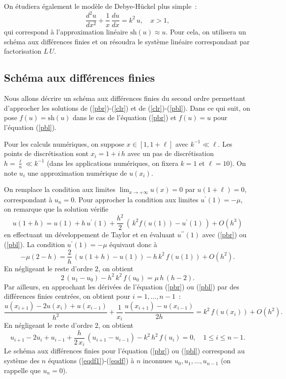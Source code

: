 \documentclass[a4paper,10pt]{article}
\begin{document}
On \'etudiera \'egalement le mod\`ele de Debye-H\"uckel plus simple~:
\begin{equation}
\label{pbl}
\frac{d^2 u}{dx^2} + \frac{1}{x}\, \frac{du}{dx} = k^2\, u, 
\quad x > 1,
\end{equation} 
qui correspond \`a l'approximation lin\'eaire $\mathrm{sh}\left( u \right) \approx u$. Pour cela, on utilisera
un sch\'ema aux diff\'erences finies et on r\'esoudra le syst\`eme lin\'eaire correspondant par
factorisation $L\, U$.

\subsection{\label{df}Sch\'ema aux diff\'erences finies}

Nous allons d\'ecrire un sch\'ema aux diff\'erences finies du second ordre permettant d'approcher les solutions
de (\ref{pbr})-(\ref{clr}) et de (\ref{clr})-(\ref{pbl}). Dans ce qui suit, on pose $f(u)=\mathrm{sh}\left( u \right)$
dans le cas de l'\'equation (\ref{pbr}) et $f(u)=u$ pour l'\'equation (\ref{pbl}).

Pour les calculs num\'eriques, on suppose $x \in [1,1+ \ell ]$ avec $k^{-1} \ll \ell $. 
Les points de discr\'etisation sont $x_i = 1+i\, h$ avec un pas de discr\'etisation
$h=\frac{\ell}{n} \ll k^{-1}$
(dans les applications num\'eriques, on fixera $k=1$ et $\ell = 10$).
On note $u_i$ une approximation num\'erique de $u(x_i )$.

On remplace la condition aux limites $\lim_{x\rightarrow +\infty}{u(x)}=0$ par 
$u(1+\ell )=0$, correspondant \`a $u_{n}=0$. 
Pour approcher la condition aux limites $u^\prime (1)=-\mu$, on remarque que la solution v\'erifie
$$
u(1+h)=u(1)+h\, u^\prime (1) + \frac{h^2}{2}\, \left( \, k^2 f(u(1)) - u^\prime (1)   \, \right) + O(h^3)
$$
en effectuant un d\'eveloppement de Taylor et en \'evaluant $u^{\prime\prime}(1)$ avec (\ref{pbr}) ou (\ref{pbl}).
La condition $u^\prime (1)=-\mu$ \'equivaut donc \`a
$$
-\mu (2-h) = \frac{2}{h}\, (u(1+h)-u(1)) - h \, k^2\, f(u(1)) +O(h^2).
$$
En n\'egligeant le reste d'ordre $2$, on obtient
\begin{equation}
\label{eqdf1}
2\, (u_1 -u_0) - h^2 \, k^2\, f(u_0)
= \mu \, h\, (h-2) 
.
\end{equation}
Par ailleurs, en approchant les d\'eriv\'ees de l'\'equation (\ref{pbr}) ou (\ref{pbl}) par des diff\'erences
finies centr\'ees, on obtient pour $i=1 , \ldots , n-1$~:
$$
\frac{u(x_{i+1})-2u(x_i)+u(x_{i-1})}{h^2}+ \frac{1}{x_i}\, \frac{u(x_{i+1})-u(x_{i-1})}{2h}= k^2\, f(u(x_i)) +O(h^2).
$$ 
En n\'egligeant le reste d'ordre $2$, on obtient
\begin{equation}
\label{eqdf}
u_{i+1}-2u_i+u_{i-1}+ \frac{h}{2\, x_i}\, (u_{i+1}-u_{i-1})- k^2\, h^2\, f(u_i) =0, \quad 1 \leq i \leq n-1 .
\end{equation}
Le sch\'ema aux diff\'erences finies pour l'\'equation (\ref{pbr}) ou (\ref{pbl})
correspond au syst\`eme des $n$ \'equations (\ref{eqdf1})-(\ref{eqdf}) \`a $n$ inconnues
$u_0 , u_1 , \ldots , u_{n-1}$ (on rappelle que $u_n =0$).
\end{document}
